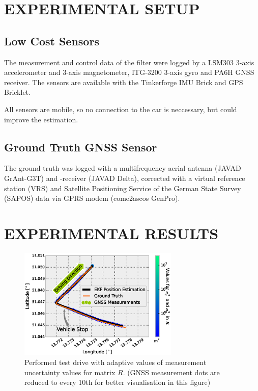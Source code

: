 \documentclass[a4paper,twoside]{article}
\begin{document}
\section{\uppercase{Experimental Setup}}

\subsection{Low Cost Sensors}

The measurement and control data of the filter were logged by a LSM303 3-axis accelerometer and 3-axis magnetometer, ITG-3200 3-axis gyro and PA6H GNSS receiver. The sensors are available with the Tinkerforge IMU Brick and GPS Bricklet.

All sensors are mobile, so no connection to the car is neccessary, but could improve the estimation.

\subsection{Ground Truth GNSS Sensor}

The ground truth was logged with a multifrequency aerial antenna (JAVAD GrAnt-G3T) and -receiver (JAVAD Delta), corrected with a virtual reference station (VRS) and Satellite Positioning Service of the German State Survey (SAPOS) data via GPRS modem (come2ascos GenPro).

\section{\uppercase{Experimental Results}}



\begin{figure}[h!]
\centering
\includegraphics[width=3.0in]{images/Extended-Kalman-Filter-CTRV-Position}
\caption{Performed test drive with adaptive values of measurement uncertainty values for matrix $R$. (GNSS measurement dots are reduced to every 10th for better visualisation in this figure)}
\label{ctrv-position}
\end{figure}
\end{document}
